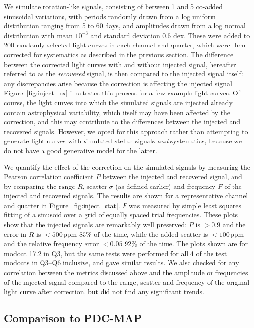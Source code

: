 \documentclass[useAMS,usenatbib]{mn2e}
\begin{document}
We simulate rotation-like signals, consisting of between 1 and 5 co-added
sinusoidal variations, with periods randomly drawn from a log uniform
distribution ranging from 5 to 60 days, and amplitudes drawn from a
log normal distribution with mean $10^{-3}$ and standard deviation 0.5
dex. These were added to 200 randomly selected light curves in each channel and quarter, which were then corrected for systematics as described in the
previous section. The difference between the corrected light curves
with and without injected signal, hereafter referred to as the
\emph{recovered} signal, is then compared to the injected
signal itself: any discrepancies arise because the correction is affecting
the injected signal. Figure~\ref{fig:inject_ex} illustrates this process
for a few example light curves. Of course, the light curves into which the
simulated signals are injected already contain astrophysical
variability, which itself may have been affected by the
correction, and this may contribute to the differences between the
injected and recovered signals. However, we opted for this approach
rather than attempting to generate light curves with simulated stellar
signals \emph{and} systematics, because we do not have a good
generative model for the latter. 

We quantify the effect of the correction on the simulated signals by
measuring the Pearson correlation coefficient $P$ between the injected
and recovered signal, and by comparing the range $R$, scatter $\sigma$
(as defined earlier) and frequency $F$ of the injected and recovered
signals. The results are shown for a representative channel and quarter in
Figure~\ref{fig:inject_stat}. $F$ was measured by simple least squares
fitting of a sinusoid over a grid of equally spaced trial
frequencies. These plots show that the injected signals are remarkably
well preserved: $P$ is $>0.9$ and the error in $R$ is $<500$\,ppm 83\%
of the time, while the added scatter is $<100$\,ppm and the relative
frequency error $<0.05$ 92\% of the time. The plots shown are for
modout 17.2 in Q3, but the same tests were performed for all 4 of the
test modouts in Q3--Q6 inclusive, and gave similar results. We also
checked for any correlation between the metrics discussed above and the
amplitude or frequencies of the injected signal compared to the range,
scatter and frequency of the original light curve after correction,
but did not find any significant trends.

\subsection{Comparison to PDC-MAP}
\label{sec:comp}
\end{document}
